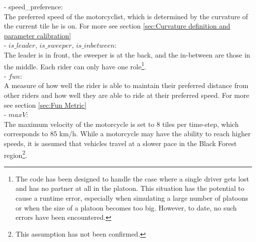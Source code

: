 \begin{itemize}
\begin{itemize}
          - speed\_preference:\\
          The preferred speed of the motorcyclist, which is determined by the curvature of the current tile he is on. For more see section \ref{sec:Curvature definition and parameter calibration}\\
          - $is\_leader$, $is\_sweeper$, $is\_inbetween$:\\
          The leader is in front, the sweeper is at the back, and the in-between are those in the middle. Each rider can only have one role\footnote{The code has been designed to handle the case where a single driver gets lost and has no partner at all in the platoon. This situation has the potential to cause a runtime error, especially when simulating a large number of platoons or when the size of a platoon becomes too big. However, to date, no such errors have been encountered.}.\\
          - $fun$:\\
          A measure of how well the rider is able to maintain their preferred distance from other riders and how well they are able to ride at their preferred speed. For more see section \ref{sec:Fun Metric}\\
          - $maxV$:\\
          The maximum velocity of the motorcycle is set to 8 tiles per time-step, which corresponds to 85 km/h. While a motorcycle may have the ability to reach higher speeds, it is assumed that vehicles travel at a slower pace in the Black Forest region\footnote{This assumption has not been confirmed.}.\\
          


\end{itemize}
\end{itemize}
